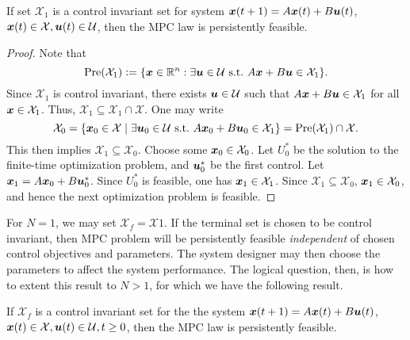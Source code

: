 \begin{lemma}
If set $\mathcal{X}_1$ is a control invariant set for system $\bm{x}(t+1) = A \bm{x}(t) + B \bm{u}(t)$, $\bm{x}(t) \in \mathcal{X}, \bm{u}(t) \in \mathcal{U}$, then the MPC law is persistently feasible. 
\end{lemma}

\begin{proof}
Note that 
\begin{equation}
    \text{Pre}(\mathcal{X}_1) \vcentcolon= \{\bm{x} \in \mathbb{R}^n : \exists \bm{u} \in \mathcal{U} \,\,\text{s.t.}\,\, A\bm{x} + B \bm{u}\in \mathcal{X}_1\}.
\end{equation}
Since $\mathcal{X}_1$ is control invariant, there exists $\bm{u} \in \mathcal{U}$ such that $A \bm{x} + B \bm{u} \in \mathcal{X}_1$ for all $\bm{x} \in \mathcal{X}_1$. Thus, $\mathcal{X}_1 \subseteq \mathcal{X}_1 \cap \mathcal{X}$. One may write 
\begin{equation}
    \mathcal{X}_0 = \{\bm{x}_0 \in \mathcal{X} \mid \exists \bm{u}_0 \in \mathcal{U}\,\, \text{s.t.}\,\, A \bm{x}_0 + B \bm{u}_0 \in \mathcal{X}_1\} = \text{Pre}(\mathcal{X}_1) \cap \mathcal{X}.
\end{equation}
This then implies $\mathcal{X}_1 \subseteq \mathcal{X}_0$. Choose some $\bm{x}_0 \in \mathcal{X}_0$. Let $U^*_0$ be the solution to the finite-time optimization problem, and $\bm{u}^*_0$ be the first control. Let $\bm{x}_1 = A \bm{x}_0 + B \bm{u}_0^*$. Since $U^*_0$ is feasible, one has $\bm{x}_1 \in \mathcal{X}_1$. Since $\mathcal{X}_1 \subseteq \mathcal{X}_0$, $\bm{x}_1 \in \mathcal{X}_0$, and hence the next optimization problem is feasible. 
\end{proof}

For $N=1$, we may set $\mathcal{X}_f = \mathcal{X}1$. If the terminal set is chosen to be control invariant, then MPC problem will be persistently feasible \textit{independent} of chosen control objectives and parameters. The system designer may then choose the parameters to affect the system performance. The logical question, then, is how to extent this result to $N>1$, for which we have the following result.

\begin{theorem}
If $\mathcal{X}_f$ is a control invariant set for the the system $\bm{x}(t+1) = A \bm{x}(t) + B \bm{u}(t)$, $\bm{x}(t) \in \mathcal{X}, \bm{u}(t) \in \mathcal{U}, t\geq 0$, then the MPC law is persistently feasible. 
\end{theorem}

